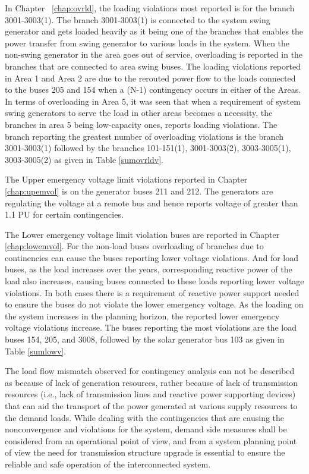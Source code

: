\documentclass[10pt]{report}
\begin{document}
In Chapter ~\ref{chap:ovrld}, the loading violations most reported is for the branch 3001-3003(1). The branch 3001-3003(1) is connected to the system swing generator and gets loaded heavily as it being one of the branches that enables the power transfer from swing generator to various loads in the system. When the non-swing generator in the area goes out of service, overloading is reported in the branches that are connected to area swing buses. The loading violations reported in Area 1 and Area 2 are due to the rerouted power flow to the loads connected to the buses 205 and 154 when a (N-1) contingency occurs in either of the Areas. In terms of overloading in Area 5, it was seen that when a requirement of system swing generators to serve the load in other areas becomes a necessity, the branches in area 5 being low-capacity ones, reports loading violations. The branch reporting the greatest number of overloading violations is the branch 3001-3003(1) followed by the branches 101-151(1), 3001-3003(2), 3003-3005(1), 3003-3005(2) as given in Table \ref{sumovrldv}. 

The Upper emergency voltage limit violations reported in Chapter \ref{chap:upemvol} is on the generator buses 211 and 212. The generators are regulating the voltage at a remote bus and hence reports voltage of greater than 1.1 PU for certain contingencies. 

The Lower emergency voltage limit violation buses are reported in Chapter \ref{chap:lowemvol}. For the non-load buses overloading of branches due to continencies can cause the buses reporting lower voltage violations. And for load buses, as the load increases over the years, corresponding reactive power of the load also increases, causing buses connected to these loads reporting lower voltage violations. In both cases there is a requirement of reactive power support needed to ensure the buses do not violate the lower emergency voltage. As the loading on the system increases in the planning horizon, the reported lower emergency voltage violations increase. The buses reporting the most violations are the load buses 154, 205, and 3008, followed by the solar generator bus 103 as given in Table \ref{sumlowv}. 

The load flow mismatch observed for contingency analysis can not be described as because of lack of generation resources, rather because of lack of transmission resources (i.e., lack of transmission lines and reactive power supporting devices) that can aid the transport of the power generated at various supply resources to the demand loads. While dealing with the contingencies that are causing the nonconvergence and violations for the system, demand side measures shall be considered from an operational point of view, and from a system planning point of view the need for transmission structure upgrade is essential to ensure the reliable and safe operation of the interconnected system. 
\end{document}
